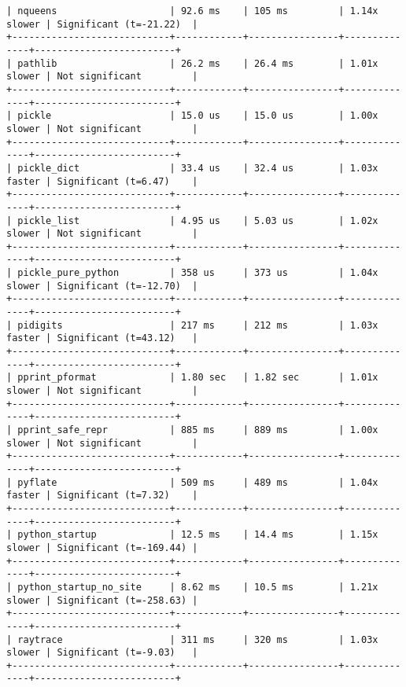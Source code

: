 \begin{code}
\begin{verbatim}
| nqueens                    | 92.6 ms    | 105 ms         | 1.14x slower | Significant (t=-21.22)  |
+----------------------------+------------+----------------+--------------+-------------------------+
| pathlib                    | 26.2 ms    | 26.4 ms        | 1.01x slower | Not significant         |
+----------------------------+------------+----------------+--------------+-------------------------+
| pickle                     | 15.0 us    | 15.0 us        | 1.00x slower | Not significant         |
+----------------------------+------------+----------------+--------------+-------------------------+
| pickle_dict                | 33.4 us    | 32.4 us        | 1.03x faster | Significant (t=6.47)    |
+----------------------------+------------+----------------+--------------+-------------------------+
| pickle_list                | 4.95 us    | 5.03 us        | 1.02x slower | Not significant         |
+----------------------------+------------+----------------+--------------+-------------------------+
| pickle_pure_python         | 358 us     | 373 us         | 1.04x slower | Significant (t=-12.70)  |
+----------------------------+------------+----------------+--------------+-------------------------+
| pidigits                   | 217 ms     | 212 ms         | 1.03x faster | Significant (t=43.12)   |
+----------------------------+------------+----------------+--------------+-------------------------+
| pprint_pformat             | 1.80 sec   | 1.82 sec       | 1.01x slower | Not significant         |
+----------------------------+------------+----------------+--------------+-------------------------+
| pprint_safe_repr           | 885 ms     | 889 ms         | 1.00x slower | Not significant         |
+----------------------------+------------+----------------+--------------+-------------------------+
| pyflate                    | 509 ms     | 489 ms         | 1.04x faster | Significant (t=7.32)    |
+----------------------------+------------+----------------+--------------+-------------------------+
| python_startup             | 12.5 ms    | 14.4 ms        | 1.15x slower | Significant (t=-169.44) |
+----------------------------+------------+----------------+--------------+-------------------------+
| python_startup_no_site     | 8.62 ms    | 10.5 ms        | 1.21x slower | Significant (t=-258.63) |
+----------------------------+------------+----------------+--------------+-------------------------+
| raytrace                   | 311 ms     | 320 ms         | 1.03x slower | Significant (t=-9.03)   |
+----------------------------+------------+----------------+--------------+-------------------------+

\end{verbatim}
\end{code}
